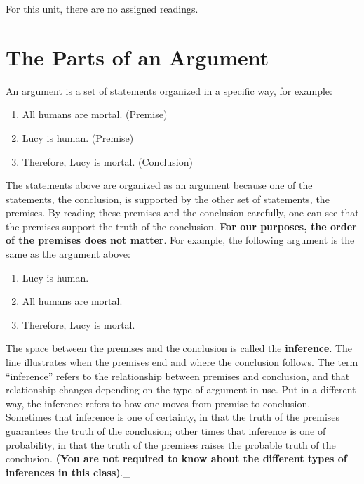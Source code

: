 \documentclass[
]{book}
\providecommand{\tightlist}{%
  \setlength{\itemsep}{0pt}\setlength{\parskip}{0pt}}
\begin{document}
For this unit, there are no assigned readings.

\hypertarget{the-parts-of-an-argument}{%
\section{The Parts of an Argument}\label{the-parts-of-an-argument}}

An argument is a set of statements organized in a specific way, for example:

\begin{enumerate}
\def\labelenumi{\arabic{enumi}.}
\tightlist
\item
  All humans are mortal. (Premise)\\
\item
  Lucy is human. (Premise)\\
\item
  Therefore, Lucy is mortal. (Conclusion)
\end{enumerate}

The statements above are organized as an argument because one of the statements, the conclusion, is supported by the other set of statements, the premises. By reading these premises and the conclusion carefully, one can see that the premises support the truth of the conclusion. \textbf{For our purposes, the order of the premises does not matter}. For example, the following argument is the same as the argument above:

\begin{enumerate}
\def\labelenumi{\arabic{enumi}.}
\tightlist
\item
  Lucy is human.\\
\item
  All humans are mortal.\\
\item
  Therefore, Lucy is mortal.
\end{enumerate}

The space between the premises and the conclusion is called the \textbf{inference}. The line illustrates when the premises end and where the conclusion follows. The term ``inference'' refers to the relationship between premises and conclusion, and that relationship changes depending on the type of argument in use. Put in a different way, the inference refers to how one moves from premise to conclusion. Sometimes that inference is one of certainty, in that the truth of the premises guarantees the truth of the conclusion; other times that inference is one of probability, in that the truth of the premises raises the probable truth of the conclusion. \textbf{(You are not required to know about the different types of inferences in this class)}.\_
\end{document}
